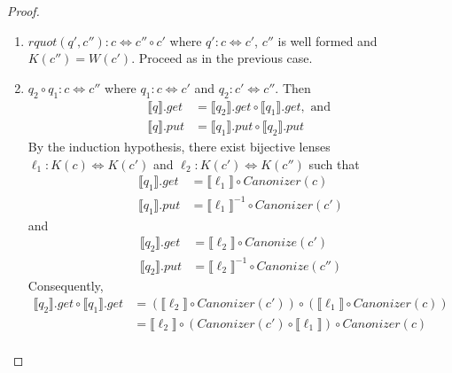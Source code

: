 \documentclass{svproc}
\newcommand{\canonizer}{\ensuremath{\mathit{Canonizer}}}
\begin{document}
\begin{proof}
\begin{enumerate}
  \item
    $\mathit{rquot}(q', c''):c \Leftrightarrow c'' \circ c'$ where $q' : c \Leftrightarrow
    c'$, $c''$ is well formed and $K(c'') = W(c')$. Proceed as in the previous
    case.
  \item
    $q_2 \circ q_1: c \Leftrightarrow c''$ where $q_1 : c \Leftrightarrow c'$ and
    $q_2 : c' \Leftrightarrow c''$. Then
    \begin{align*}
      \llbracket q \rrbracket.get &= \llbracket q_2 \rrbracket.get\circ \llbracket
                                    q_1 \rrbracket.get, \text{ and }\\
      \llbracket q \rrbracket.put &= \llbracket q_1 \rrbracket.put \circ \llbracket
                                    q_2 \rrbracket.put
    \end{align*}
    By the induction hypothesis, there exist bijective lenses
    $\ell_1 :
    K(c) \Leftrightarrow K(c')$ and $\ell_2 : K(c') \Leftrightarrow K(c'')$ such
    that
    \begin{align*}
      \llbracket q_1 \rrbracket.get &= \llbracket \ell_1 \rrbracket \circ
                                      \canonizer(c)\\
      \llbracket q_1 \rrbracket.put &= {\llbracket \ell_1 \rrbracket}^{-1} \circ
                                      \canonizer(c')
    \end{align*}
    and
    \begin{align*}
      \llbracket q_2 \rrbracket.get &= \llbracket \ell_2 \rrbracket \circ
                                      Canonize(c')\\
      \llbracket q_2 \rrbracket.put &= {\llbracket \ell_2 \rrbracket}^{-1} \circ
                                      Canonize(c'')
    \end{align*}
    Consequently,
    \begin{align*}
      \llbracket q_2 \rrbracket.get \circ \llbracket q_1 \rrbracket.get &=
                                                                          (\llbracket \ell_2 \rrbracket \circ \canonizer(c')) \circ (\llbracket \ell_1
                                                                          \rrbracket \circ \canonizer(c))\\
                                                                        &= \llbracket \ell_2 \rrbracket \circ (\canonizer(c') \circ \llbracket \ell_1
                                                                          \rrbracket) \circ \canonizer(c)\\

\end{align*}
\end{enumerate}
\end{proof}
\end{document}
